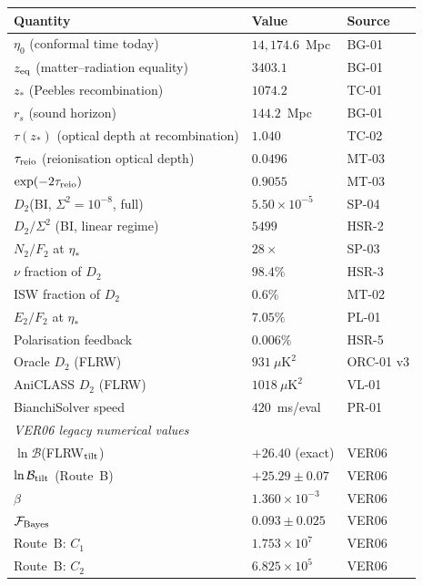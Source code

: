 \begin{center}
\setlength{\tabcolsep}{4pt}
\begin{tabular}{lll}
\hline\hline
Quantity & Value & Source \\
\hline
$\eta_0$ (conformal time today)
  & $14{,}174.6$~Mpc & BG-01 \\[2pt]
$z_{\rm eq}$ (matter--radiation equality)
  & $3403.1$ & BG-01 \\[2pt]
$z_*$ (Peebles recombination)
  & $1074.2$ & TC-01 \\[2pt]
$r_s$ (sound horizon)
  & $144.2$~Mpc & BG-01 \\[2pt]
$\tau(z_*)$ (optical depth at recombination)
  & $1.040$ & TC-02 \\[2pt]
$\tau_{\rm reio}$ (reionisation optical depth)
  & $0.0496$ & MT-03 \\[2pt]
$\exp(-2\tau_{\rm reio})$
  & $0.9055$ & MT-03 \\[2pt]
$D_2$(BI, $\Sigma^2 = 10^{-8}$, full)
  & $5.50 \times 10^{-5}$ & SP-04 \\[2pt]
$D_2/\Sigma^2$ (BI, linear regime)
  & $5499$ & HSR-2 \\[2pt]
$N_2/F_2$ at $\eta_*$
  & $28\times$ & SP-03 \\[2pt]
$\nu$ fraction of $D_2$
  & $98.4\%$ & HSR-3 \\[2pt]
ISW fraction of $D_2$
  & $0.6\%$ & MT-02 \\[2pt]
$E_2/F_2$ at $\eta_*$
  & $7.05\%$ & PL-01 \\[2pt]
Polarisation feedback
  & $0.006\%$ & HSR-5 \\[2pt]
Oracle $D_2$ (FLRW)
  & $931~\mu\mathrm{K}^2$ & ORC-01 v3 \\[2pt]
AniCLASS $D_2$ (FLRW)
  & $1018~\mu\mathrm{K}^2$ & VL-01 \\[2pt]
BianchiSolver speed
  & $420$~ms/eval & PR-01 \\[2pt]
\hline
\multicolumn{3}{l}{\emph{VER06 legacy numerical values}} \\[2pt]
$\ln \mathcal{B}$(FLRW$_{\rm tilt}$)
  & $+26.40$ (exact) & VER06 \\[2pt]
$\ln \mathcal{B}_{\rm tilt}$ (Route~B)
  & $+25.29 \pm 0.07$ & VER06 \\[2pt]
$\beta$
  & $1.360 \times 10^{-3}$ & VER06 \\[2pt]
$\mathcal{F}_{\rm Bayes}$
  & $0.093 \pm 0.025$ & VER06 \\[2pt]
Route~B: $C_1$
  & $1.753 \times 10^7$ & VER06 \\[2pt]
Route~B: $C_2$
  & $6.825 \times 10^5$ & VER06 \\
\hline\hline
\end{tabular}
\end{center}


